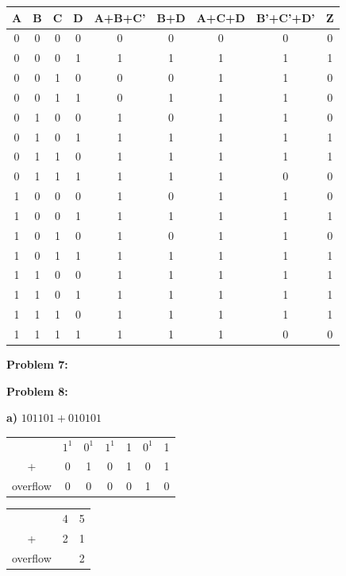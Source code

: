 \documentclass{article}
\begin{document}
\begin{center}
\begin{tabular}{ c|c|c|c|c|c|c|c|c }
        \end{tabular}
        \begin{tabular}{ c|c|c|c|c|c|c|c|c }
            A & B & C & D & A+B+C' & B+D & A+C+D & B'+C'+D' & Z \\
            \hline
            0 & 0 & 0 & 0 & 0& 0& 0& 0& 0\\
            0 & 0 & 0 & 1 & 1& 1& 1& 1& 1\\
            0 & 0 & 1 & 0 & 0& 0& 1& 1& 0\\
            0 & 0 & 1 & 1 & 0& 1& 1& 1& 0\\
            0 & 1 & 0 & 0 & 1& 0& 1& 1& 0\\
            0 & 1 & 0 & 1 & 1& 1& 1& 1& 1\\
            0 & 1 & 1 & 0 & 1& 1& 1& 1& 1\\
            0 & 1 & 1 & 1 & 1& 1& 1& 0& 0\\
            1 & 0 & 0 & 0 & 1& 0& 1& 1& 0\\
            1 & 0 & 0 & 1 & 1& 1& 1& 1& 1\\
            1 & 0 & 1 & 0 & 1& 0& 1& 1& 0\\
            1 & 0 & 1 & 1 & 1& 1& 1& 1& 1\\
            1 & 1 & 0 & 0 & 1& 1& 1& 1& 1\\
            1 & 1 & 0 & 1 & 1& 1& 1& 1& 1\\
            1 & 1 & 1 & 0 & 1& 1& 1& 1& 1\\
            1 & 1 & 1 & 1 & 1& 1& 1& 0& 0
            
        \end{tabular}
    \end{center}

    \textbf{Problem 7:}

    \quad\quad
    \noindent{}

    \textbf{Problem 8:}

    \quad \textbf{a)} $101101+010101$

    \begin{center}
        \begin{tabular}{ ccccccc }
            & $1^1$ & $0^1$ & $1^1$ & 1 & $0^1$ & 1 \\
            + & 0   & 1   & 0   & 1 & 0   & 1 \\
            \hline
            overflow & 0 & 0 & 0 & 0 & 1 & 0
        \end{tabular}
        \quad\quad 
        \begin{tabular}{ ccc }
            & 4 & 5 \\
            + & 2 & 1 \\
            \hline
            overflow & & 2
        \end{tabular}
    \end{center}
\end{document}
